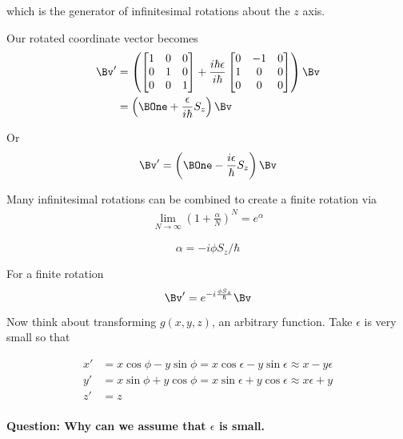 which is the generator of infinitesimal rotations about the $z$ axis.

Our rotated coordinate vector becomes
\begin{align*}
\Bv' &=
\left(
\begin{bmatrix}
1 & 0 & 0 \\
0 & 1 & 0 \\
0 & 0 & 1
\end{bmatrix}
+
\frac{i \hbar \epsilon}{i\hbar}
\begin{bmatrix}
0 &- 1 & 0 \\
1 & 0 & 0 \\
0 & 0 & 0
\end{bmatrix}
\right)
\Bv \\
&=
\left(
\BOne + \frac{\epsilon}{i \hbar} S_z
\right)
\Bv
\end{align*}

Or
\begin{align}\label{eqn:PHY356FDec7:70}
\Bv'
=
\left(
\BOne - \frac{i \epsilon}{\hbar} S_z
\right)
\Bv
\end{align}

Many infinitesimal rotations can be combined to create a finite rotation via
\begin{align}\label{eqn:PHY356FDec7:80}
\lim_{N \rightarrow \infty} \left( 1 + \frac{\alpha}{N} \right)^N = e^\alpha
\end{align}

\begin{equation}\label{eqn:PHY356FDec7:85}
\alpha = -i \phi S_z/\hbar
\end{equation}

For a finite rotation
\begin{equation}\label{eqn:PHY356FDec7:90}
\Bv'
=
e^{ -i \frac{\phi S_z}{\hbar} }
\Bv
\end{equation}

Now think about transforming $g(x,y,z)$, an arbitrary function.  Take $\epsilon$ is very small so that

\begin{align}\label{eqn:PHY356FDec7:100}
x' &= x \cos \phi - y \sin\phi = x \cos \epsilon - y \sin\epsilon \approx x - y \epsilon \\
y' &= x \sin \phi + y \cos\phi = x \sin \epsilon + y \cos\epsilon \approx x \epsilon + y \\
z' &= z
\end{align}

\paragraph{Question: Why can we assume that $\epsilon$ is small.}
